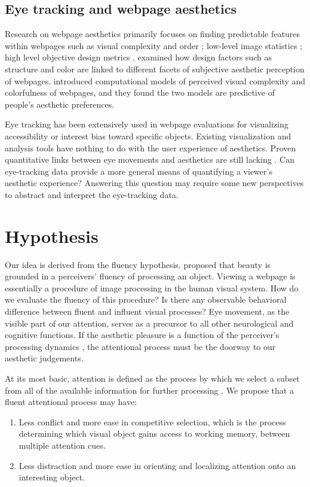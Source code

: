 \subsection{Eye tracking and webpage aesthetics}
Research on webpage aesthetics primarily focuses on finding predictable features within webpages such as visual complexity and order \citep{Deng2010}; low-level image statistics \citep{Zheng}; high level objective design metrics \citep {Ivory}.  examined how design factors such as structure and color are linked to different facets of subjective aesthetic perception of webpages.
 introduced computational models of perceived visual complexity and colorfulness of webpages, and they found the two models are predictive of people's aesthetic preferences.

Eye tracking has been extensively used in webpage evaluations for visualizing accessibility or interest bias toward specific objects.
Existing visualization and analysis tools have nothing to do with the user experience of aesthetics.
Proven quantitative links between eye movements and aesthetics are still lacking \citep{Santella}.
Can eye-tracking data provide a more general means of quantifying a viewer's aesthetic experience?
Answering this question may require some new perspectives to abstract and interpret the eye-tracking data.

\section{Hypothesis}
\label{sec:hyp}
Our idea is derived from the fluency hypothesis.
 proposed that beauty is grounded in a perceivers' fluency of processing an object.
Viewing a webpage is essentially a procedure of image processing in the human visual system.
How do we evaluate the fluency of this procedure?
Is there any observable behavioral difference between fluent and influent visual processes?
Eye movement, as the visible part of our attention, serves as a precursor to all other neurological and cognitive functions.
If the aesthetic pleasure is a function of the perceiver's processing dynamics \citep{Reber2004}, the attentional process must be the doorway to our aesthetic judgements.

At its most basic, attention is defined as the process by which we select a subset from all of the available information for further processing \citep{Eriksen1972}.
We propose that a fluent attentional process may have:
\begin{enumerate}
  \item Less conflict and more ease in competitive selection, which is the process determining which visual object gains access to working memory, between multiple attention cues.
  \item Less distraction and more ease in orienting and localizing attention onto an interesting object.
\end{enumerate}

